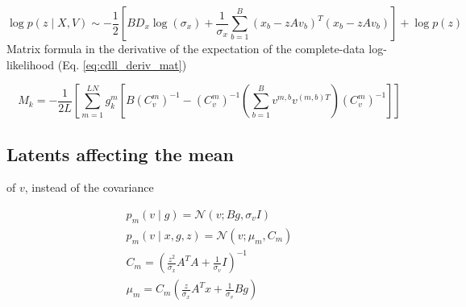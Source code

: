 \documentclass{paper}
\begin{document}
\begin{equation} 
\log p(z \mid X,V) \sim -\frac{1}{2} \left[B D_x\log(\sigma_x) + \frac{1}{\sigma_x} \sum_{b=1}^B (x_b - zAv_b)^T (x_b - zAv_b)\right] + \log p(z)
\end{equation}
Matrix formula in the derivative of the expectation of the complete-data log-likelihood (Eq. \ref{eq:cdll_deriv_mat})

\begin{equation}
M_k = -\frac{1}{2L} \left[ \sum_{m=1}^{LN} g_k^{m} \left[ B \left( C_v^m \right)^{-1} -  \left( C_v^m \right)^{-1} \left( \sum_{b=1}^B v^{m,b} v^{(m,b)T} \right) \left( C_v^m \right)^{-1} \right]\right]
\end{equation}

\subsection{Latents affecting the mean}

of $v$, instead of the covariance

\begin{eqnarray}
p_m(v \mid g) = \mathcal{N}(v; Bg,\sigma_v I) \\
p_m(v \mid x,g,z) = \mathcal{N}(v;\mu_m,C_m) \\
C_m =  \left(\frac{z^2}{\sigma_x} A^T A + \frac{1}{\sigma_v} I \right)^{-1} \\
\mu_m = C_m \left(\frac{z}{\sigma_x} A^T x +  \frac{1}{\sigma_v} B g \right)
\end{eqnarray}
\end{document}
